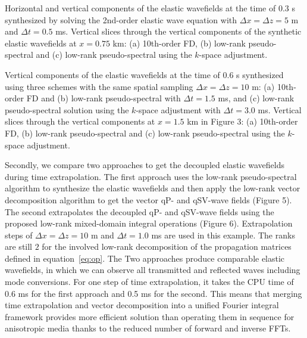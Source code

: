 {
Horizontal and vertical components of the elastic wavefields at the time of 0.3 s synthesized by solving the
	2nd-order elastic wave equation with $\Delta{x}=\Delta{z}=5$ m and $\Delta{t}=0.5$ ms.
}
{
Vertical slices through the vertical components of the synthetic elastic wavefields at $x=0.75$ km: (a) 10th-order FD, (b) low-rank pseudo-spectral and (c) low-rank pseudo-spectral using the $k$-space adjustment.
}

{
Vertical components of the elastic wavefields at the time of 0.6 s synthesized using three schemes with the same spatial sampling
$\Delta{x}=\Delta{z}=10$ m: (a) 10th-order FD and (b) low-rank pseudo-spectral with $\Delta{t}=1.5$ ms,
and (c) low-rank pseudo-spectral solution using the $k$-space adjustment with $\Delta{t}=3.0$ ms.
}
{
Vertical slices through the vertical components at $x=1.5$ km in Figure 3: (a) 10th-order FD,
(b) low-rank pseudo-spectral and (c) low-rank pseudo-spectral using the $k$-space adjustment.
}

Secondly, we compare two approaches to get the decoupled elastic wavefields
during time extrapolation.
The first approach uses the low-rank pseudo-spectral algorithm
to synthesize the elastic wavefields and then apply the low-rank vector
decomposition algorithm \cite[]{cheng.fomel:2014} to get the vector qP- and
qSV-wave fields (Figure 5).
The second extrapolates the decoupled qP- and
qSV-wave fields using the proposed low-rank mixed-domain integral operations (Figure 6).
Extrapolation steps of $\Delta{x}=\Delta{z}=10$ m and $\Delta{t}=1.0$ ms are used in this example.
The ranks are still $2$
for the involved low-rank decomposition of the propagation matrices defined in equation~\ref{eq:op}. 
The Two approaches produce comparable elastic wavefields,
in which we can observe all transmitted and reflected waves including mode
conversions.
For one step of time extrapolation, it takes the CPU time of 0.6 ms for the first approach
and 0.5 ms for the second.
This means that merging time extrapolation and vector decomposition into a unified
Fourier integral framework 
provides more efficient solution than operating them in sequence
for anisotropic media thanks to the reduced number of forward and inverse FFTs.

